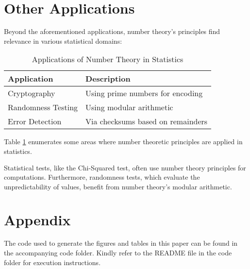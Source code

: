 \documentclass{article}
\begin{document}
\section{Other Applications}
Beyond the aforementioned applications, number theory's principles find relevance in various statistical domains:

\begin{table}[h]
\centering
\begin{tabular}{|l|l|}
\hline
Application & Description \\
\hline
Cryptography & Using prime numbers for encoding \\
\hline
Randomness Testing & Using modular arithmetic \\
\hline
Error Detection & Via checksums based on remainders \\
\hline
\end{tabular}
\caption{Applications of Number Theory in Statistics}
\label{table:applications}
\end{table}

Table \ref{table:applications} enumerates some areas where number theoretic principles are applied in statistics.

Statistical tests, like the Chi-Squared test, often use number theory principles for computations. Furthermore, randomness tests, which evaluate the unpredictability of values, benefit from number theory's modular arithmetic\citet{latexcompanion}.

\section*{Appendix}
The code used to generate the figures and tables in this paper can be found in the accompanying code folder. Kindly refer to the README file in the code folder for execution instructions.




\end{document}
